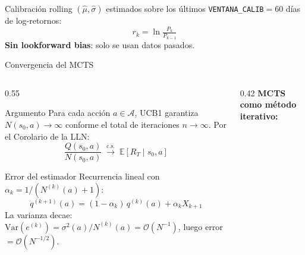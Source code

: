 \documentclass[aspectratio=169, 10pt]{beamer}
\begin{document}

\begin{frame}
      \begin{exampleblock}{Calibración rolling}
        $(\hat\mu,\hat\sigma)$ estimados sobre los últimos
        \texttt{VENTANA\_CALIB}$=60$ días de log-retornos:
        \[
          r_k = \ln\!\tfrac{P_k}{P_{k-1}}
        \]
        \textbf{Sin lookforward bias}: solo se usan datos pasados.
      \end{exampleblock}
\end{frame}

\begin{frame}{Convergencia del MCTS}
  \begin{columns}[T]
    \begin{column}{0.55\textwidth}
      \begin{block}{Argumento}
        Para cada acción $a\in\mathcal{A}$, UCB1 garantiza
        $N(s_0,a)\to\infty$ conforme el total de iteraciones $n\to\infty$.
        Por el Corolario de la LLN:
        \[
          \frac{Q(s_0,a)}{N(s_0,a)}
          \;\xrightarrow{\text{c.s.}}\;
          \mathbb{E}[R_T\mid s_0,a]
        \]
      \end{block}

      \vspace{0.1cm}
      \begin{block}{Error del estimador}
        Recurrencia lineal con $\alpha_k = 1/(N^{(k)}(a)+1)$:
        \[
          q^{(k+1)}(a) = (1-\alpha_k)\,q^{(k)}(a) + \alpha_k X_{k+1}
        \]
        La varianza decae: $\mathrm{Var}(e^{(k)}) = \sigma^2(a)/N^{(k)}(a) = \mathcal{O}(N^{-1})$,
        luego error $= \mathcal{O}(N^{-1/2})$.
      \end{block}
    \end{column}
    \begin{column}{0.42\textwidth}
      \textbf{MCTS como método iterativo:}
      \vspace{0.15cm}


\end{column}
\end{columns}
\end{frame}
\end{document}
